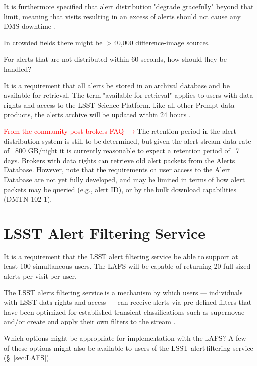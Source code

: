 \documentclass[DM,lsstdraft,authoryear,toc]{lsstdoc}
\begin{document}
It is furthermore specified that alert distribution "degrade gracefully" beyond that limit, meaning that visits resulting in an excess of alerts should not cause any DMS downtime .


In crowded fields there might be $>$40,000 difference-image sources.

For alerts that are not distributed within 60 seconds, how should they be handled? 

It is a requirement that all alerts be stored in an archival database and be available for retrieval. The term "available for retrieval" applies to users with data rights and access to the LSST Science Platform. Like all other Prompt data products, the alerts archive will be updated within 24 hours .

\textcolor{red}{From the community post brokers FAQ $\rightarrow$}The retention period in the alert distribution system is still to be determined, but given the alert stream data rate of ~800 GB/night it is currently reasonable to expect a retention period of ~7 days. Brokers with data rights can retrieve old alert packets from the Alerts Database. However, note that the requirements on user access to the Alert Database are not yet fully developed, and may be limited in terms of how alert packets may be queried (e.g., alert ID), or by the bulk download capabilities (DMTN-102 1).



\clearpage
\section{LSST Alert Filtering Service}\label{sec:lafs}

It is a requirement that the LSST alert filtering service be able to support at least 100 simultaneous users. The LAFS will be capable of returning 20 full-sized alerts per visit per user.

The LSST alerts filtering service is a mechanism by which users --- individuals with LSST data rights and access --- can receive alerts via pre-defined filters that have been optimized for established transient classifications such as supernovae and/or create and apply their own filters to the stream . 

Which options might be appropriate for implementation with the LAFS?
A few of these options might also be available to users of the LSST alert filtering service (\S~\ref{sec:LAFS}).



\end{document}
